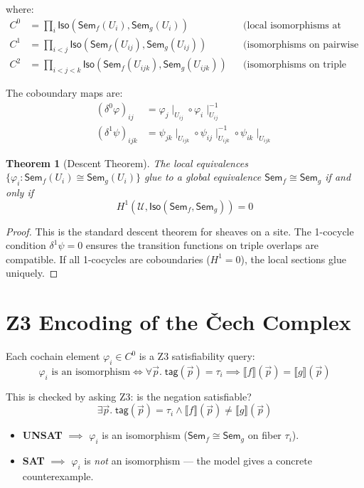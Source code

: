 \documentclass[11pt,a4paper]{report}
\theoremstyle{definition}
\theoremstyle{plain}
\newtheorem{theorem}[definition]{Theorem}
\newcommand{\den}[1]{\llbracket #1 \rrbracket}     %
\newcommand{\iso}{\cong}
\newcommand{\covers}{\mathcal{U}}
\newcommand{\Sem}{\mathsf{Sem}}
\newcommand{\Iso}{\mathsf{Iso}}
\newcommand{\Hone}{H^1}
\newcommand{\restr}[2]{#1\!\!\mid_{#2}}
\begin{document}
where:
\begin{align}
  C^0 &= \prod_i \Iso(\Sem_f(U_i), \Sem_g(U_i))
    && \text{(local isomorphisms at each fiber)} \\
  C^1 &= \prod_{i < j} \Iso(\Sem_f(U_{ij}), \Sem_g(U_{ij}))
    && \text{(isomorphisms on pairwise overlaps)} \\
  C^2 &= \prod_{i < j < k} \Iso(\Sem_f(U_{ijk}), \Sem_g(U_{ijk}))
    && \text{(isomorphisms on triple overlaps)}
\end{align}

The coboundary maps are:
\begin{align}
  (\delta^0 \varphi)_{ij} &= \restr{\varphi_j}{U_{ij}} \circ
    \restr{\varphi_i}{U_{ij}}^{-1} \\
  (\delta^1 \psi)_{ijk} &= \restr{\psi_{jk}}{U_{ijk}} \circ
    \restr{\psi_{ij}}{U_{ijk}}^{-1} \circ
    \restr{\psi_{ik}}{U_{ijk}}
\end{align}

\begin{theorem}[Descent Theorem]
\label{thm:descent}
The local equivalences $\{\varphi_i : \Sem_f(U_i) \iso \Sem_g(U_i)\}$
glue to a global equivalence $\Sem_f \iso \Sem_g$ if and only if
\[
  \Hone(\covers, \Iso(\Sem_f, \Sem_g)) = 0
\]
\end{theorem}

\begin{proof}
This is the standard descent theorem for sheaves on a site.
The 1-cocycle condition $\delta^1 \psi = 0$ ensures the transition
functions on triple overlaps are compatible.  If all 1-cocycles are
coboundaries ($\Hone = 0$), the local sections glue uniquely.
\end{proof}

\section{Z3 Encoding of the \v{C}ech Complex}

Each cochain element $\varphi_i \in C^0$ is a Z3 satisfiability query:
\[
  \varphi_i \text{ is an isomorphism} \iff
  \forall \vec{p}.\; \mathsf{tag}(\vec{p}) = \tau_i \implies
  \den{f}(\vec{p}) = \den{g}(\vec{p})
\]

This is checked by asking Z3: is the negation satisfiable?
\[
  \exists \vec{p}.\; \mathsf{tag}(\vec{p}) = \tau_i \land
  \den{f}(\vec{p}) \neq \den{g}(\vec{p})
\]

\begin{itemize}
  \item \textbf{UNSAT} $\implies$ $\varphi_i$ is an isomorphism
    ($\Sem_f \iso \Sem_g$ on fiber $\tau_i$).
  \item \textbf{SAT} $\implies$ $\varphi_i$ is \emph{not} an
    isomorphism --- the model gives a concrete counterexample.
\end{itemize}
\end{document}
